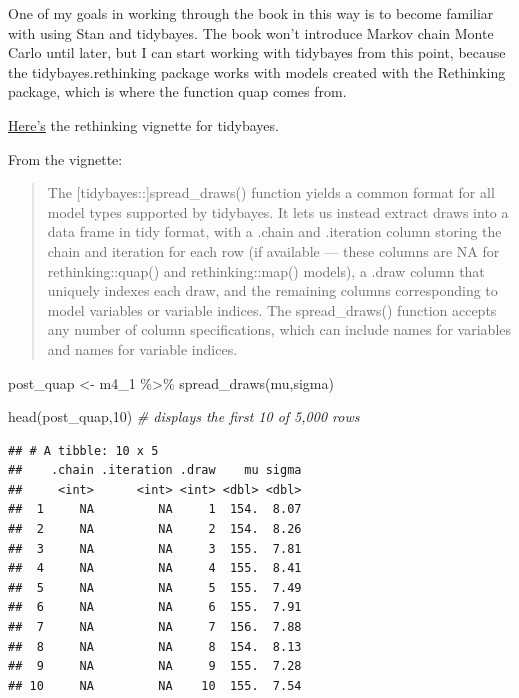 \documentclass[
]{book}
\newenvironment{Shaded}{\begin{snugshade}}{\end{snugshade}}
\newcommand{\CommentTok}[1]{\textcolor[rgb]{0.56,0.35,0.01}{\textit{#1}}}
\newcommand{\DecValTok}[1]{\textcolor[rgb]{0.00,0.00,0.81}{#1}}
\newcommand{\FunctionTok}[1]{\textcolor[rgb]{0.00,0.00,0.00}{#1}}
\newcommand{\NormalTok}[1]{#1}
\newcommand{\OtherTok}[1]{\textcolor[rgb]{0.56,0.35,0.01}{#1}}
\newcommand{\SpecialCharTok}[1]{\textcolor[rgb]{0.00,0.00,0.00}{#1}}
\begin{document}
One of my goals in working through the book in this way is to become familiar with using Stan and tidybayes. The book won't introduce Markov chain Monte Carlo until later, but I can start working with tidybayes from this point, because the tidybayes.rethinking package works with models created with the Rethinking package, which is where the function quap comes from.

\href{https://mjskay.github.io/tidybayes.rethinking/articles/tidy-rethinking.html}{Here's} the rethinking vignette for tidybayes.

From the vignette:

\begin{quote}
The {[}tidybayes::{]}spread\_draws() function yields a common format for all model types supported by tidybayes. It lets us instead extract draws into a data frame in tidy format, with a .chain and .iteration column storing the chain and iteration for each row (if available --- these columns are NA for rethinking::quap() and rethinking::map() models), a .draw column that uniquely indexes each draw, and the remaining columns corresponding to model variables or variable indices. The spread\_draws() function accepts any number of column specifications, which can include names for variables and names for variable indices.
\end{quote}

\begin{Shaded}
\begin{Highlighting}[]
\NormalTok{post\_quap }\OtherTok{\textless{}{-}}\NormalTok{ m4\_1 }\SpecialCharTok{\%\textgreater{}\%}
  \FunctionTok{spread\_draws}\NormalTok{(mu,sigma)}

\FunctionTok{head}\NormalTok{(post\_quap,}\DecValTok{10}\NormalTok{) }\CommentTok{\# displays the first 10 of 5,000 rows}
\end{Highlighting}
\end{Shaded}

\begin{verbatim}
## # A tibble: 10 x 5
##    .chain .iteration .draw    mu sigma
##     <int>      <int> <int> <dbl> <dbl>
##  1     NA         NA     1  154.  8.07
##  2     NA         NA     2  154.  8.26
##  3     NA         NA     3  155.  7.81
##  4     NA         NA     4  155.  8.41
##  5     NA         NA     5  155.  7.49
##  6     NA         NA     6  155.  7.91
##  7     NA         NA     7  156.  7.88
##  8     NA         NA     8  154.  8.13
##  9     NA         NA     9  155.  7.28
## 10     NA         NA    10  155.  7.54
\end{verbatim}
\end{document}
